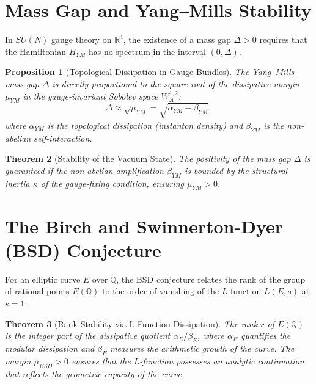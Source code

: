 \documentclass[11pt,a4paper]{amsart}
\newtheorem{theorem}{Theorem}[section]
\newtheorem{proposition}[theorem]{Proposition}
\newcommand{\alphacoeff}{\ensuremath{\alpha}}
\newcommand{\betacoeff}{\ensuremath{\beta}}
\newcommand{\kappacoeff}{\ensuremath{\kappa}}
\newcommand{\mumargin}{\ensuremath{\mu}}
\begin{document}
{\section{Mass Gap and Yang--Mills Stability}
In $SU(N)$ gauge theory on $\mathbb{R}^4$, the existence of a mass gap 
$\Delta > 0$ requires that the Hamiltonian $H_{YM}$ has no spectrum in 
the interval $(0, \Delta)$.

\begin{proposition}[Topological Dissipation in Gauge Bundles]
The Yang--Mills mass gap $\Delta$ is directly proportional to the 
square root of the dissipative margin $\mumargin_{YM}$ in the 
gauge-invariant Sobolev space $W^{1,2}_A$:
\begin{equation}
 \Delta \approx \sqrt{\mumargin_{YM}} = \sqrt{\alphacoeff_{YM} - \betacoeff_{YM}},
\end{equation}
where $\alphacoeff_{YM}$ is the topological dissipation (instanton density) 
and $\betacoeff_{YM}$ is the non-abelian self-interaction.
\end{proposition}

\begin{theorem}[Stability of the Vacuum State]
The positivity of the mass gap $\Delta$ is guaranteed if the 
non-abelian amplification $\betacoeff_{YM}$ is bounded by the 
structural inertia $\kappacoeff$ of the gauge-fixing condition, 
ensuring $\mumargin_{YM} > 0$.
\end{theorem}

\section{The Birch and Swinnerton-Dyer (BSD) Conjecture}
For an elliptic curve $E$ over $\mathbb{Q}$, the BSD conjecture relates the 
rank of the group of rational points $E(\mathbb{Q})$ to the order of vanishing 
of the $L$-function $L(E, s)$ at $s=1$.

\begin{theorem}[Rank Stability via L-Function Dissipation]
The rank $r$ of $E(\mathbb{Q})$ is the integer part of the dissipative 
quotient $\alphacoeff_{E} / \betacoeff_{E}$, where $\alphacoeff_{E}$ 
quantifies the modular dissipation and $\betacoeff_{E}$ measures the 
arithmetic growth of the curve. The margin $\mumargin_{BSD} > 0$ ensures 
that the $L$-function possesses an analytic continuation that reflects 
the geometric capacity of the curve.
\end{theorem}

}
\end{document}

